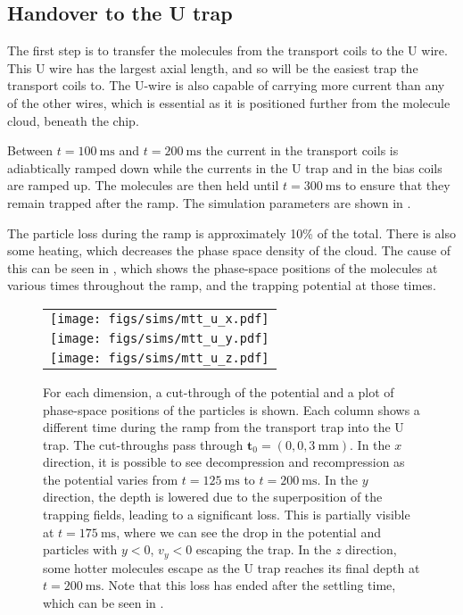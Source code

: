\subsection{Handover to the U trap}
\label{design:sim:trans_U}


%
The first step is to transfer the molecules from the transport coils to the U
wire. This U wire has the largest axial length, and so will be the easiest trap
the transport coils to. The U-wire is also capable of carrying more current
than any of the other wires, which is essential as it is positioned further
from the molecule cloud, beneath the chip.

Between $t=\SI{100}{\milli\second}$ and $t=\SI{200}{\milli\second}$ the current
in the transport coils is adiabtically ramped down while the currents in
the U trap and in the bias coils are ramped up. The molecules are then held
until $t=\SI{300}{\milli\second}$ to ensure that they remain trapped after the
ramp. The simulation parameters are shown in
.

The particle loss during the ramp is approximately 10\% of the total. There is
also some heating, which decreases the phase space density of the cloud. The
cause of this can be seen in , which shows the
phase-space positions of the molecules at various times throughout the ramp,
and the trapping potential at those times.

\begin{figure}[p]
\centering
  \begin{tabular}{c}
    \texttt{[image: figs/sims/mtt\_u\_x.pdf]} \\
    \texttt{[image: figs/sims/mtt\_u\_y.pdf]} \\
    \texttt{[image: figs/sims/mtt\_u\_z.pdf]}
  \end{tabular}
  \caption{
    For each dimension, a cut-through of the potential and a plot of
    phase-space positions of the particles is shown. Each column shows a
    different time during the ramp from the transport trap into the U trap. The
    cut-throughs pass through $\mathbf{t}_0 = (0, 0, \SI{3}{\milli\meter})$. In
    the $x$ direction, it is possible to see decompression and recompression as
    the potential varies from $t=\SI{125}{\milli\second}$ to
    $t=\SI{200}{\milli\second}$. In the $y$ direction, the depth is lowered due
    to the superposition of the trapping fields, leading to a significant loss.
    This is partially visible at $t=\SI{175}{\milli\second}$, where we can see
    the drop in the potential and particles with $y<0$, $v_y<0$ escaping the
    trap. In the $z$ direction, some hotter molecules escape as the U trap
    reaches its final depth at $t=\SI{200}{\milli\second}$. Note that this loss
    has ended after the settling time, which can be seen in
    .
  }
  \label{design:fig:trans_U}
\end{figure}

